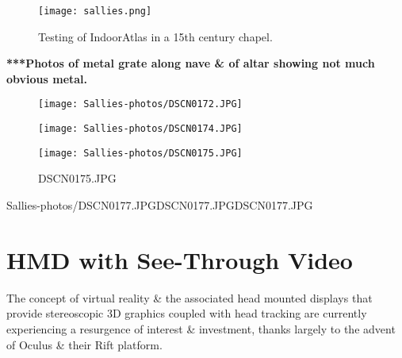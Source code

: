 \begin{figure}[h]
	\begin{center}
		\texttt{[image: sallies.png]}
		\caption{Testing of IndoorAtlas in a 15th century chapel.}
		\label{sallies.png}
	\end{center}
\end{figure}

\textbf{***Photos of metal grate along nave \& of altar showing not much obvious metal.}

\begin{figure}[h]
    \begin{center}
    \begin{minipage}{.32\textwidth}
        \begin{center}
        \texttt{[image: Sallies-photos/DSCN0172.JPG]}
        \caption{DSCN0172.JPG}
        \label{DSCN0172.JPG}
        \end{center}
    \end{minipage}%
    \hspace{.01\textwidth}
    \begin{minipage}{.32\textwidth}
		\begin{center}
        \texttt{[image: Sallies-photos/DSCN0174.JPG]}
        \caption{DSCN0174.JPG}
        \label{DSCN0174.JPG}
        \end{center}
    \end{minipage}%
    \hspace{.01\textwidth}
    \begin{minipage}{.32\textwidth}
        \begin{center}
        \texttt{[image: Sallies-photos/DSCN0175.JPG]}
        \caption{DSCN0175.JPG}
        \label{DSCN0175.JPG}
        \end{center}
    \end{minipage}
    \end{center}
\end{figure}

       {Sallies-photos/DSCN0177.JPG}{DSCN0177.JPG}{DSCN0177.JPG}


\section{HMD with See-Through Video}
The concept of virtual reality \& the associated head mounted displays that provide stereoscopic 3D graphics coupled with head tracking are currently experiencing a resurgence of interest \& investment, thanks largely to the advent of Oculus \& their Rift platform.

